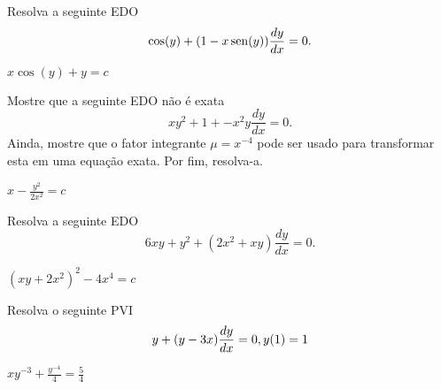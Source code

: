 \begin{exer}
  Resolva a seguinte EDO
  \begin{equation}
    \cos(y) + (1-x\operatorname{sen}(y))\frac{dy}{dx} = 0.
  \end{equation}
\end{exer}
\begin{resp}
  $x\cos(y) + y = c$
\end{resp}

\begin{exer}
  Mostre que a seguinte EDO não é exata
  \begin{equation}
    xy^2+1 + -x^2y\frac{dy}{dx} = 0.
  \end{equation}
  Ainda, mostre que o fator integrante $\mu = x^{-4}$ pode ser usado para transformar esta em uma equação exata. Por fim, resolva-a.
\end{exer}
\begin{resp}
  $x - \frac{y^2}{2x^2} = c$
\end{resp}

\begin{exer}
  Resolva a seguinte EDO
  \begin{equation}
    6xy+y^2 + (2x^2+xy)\frac{dy}{dx} = 0.
  \end{equation}
\end{exer}
\begin{resp}
  $(xy+2x^2)^2-4x^4=c$
\end{resp}

\begin{exer}
  Resolva o seguinte PVI
  \begin{equation}
    y + (y-3x)\frac{dy}{dx} = 0,\\
    y(1)=1
  \end{equation}
\end{exer}
\begin{resp}
  $xy^{-3}+\frac{y^{-4}}{4} = \frac{5}{4}$
\end{resp}